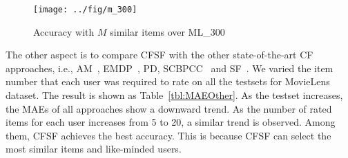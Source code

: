 \begin{figure}[htb]
  \centering
  \texttt{[image: ../fig/m\_300]}\\
  \vspace{-2ex}\caption{Accuracy with $M$ similar items over ML\_300}
  \label{fig:m}
\end{figure}

The other aspect is to compare CFSF with the other state-of-the-art CF approaches, i.e., AM~\cite{HOFMANN@TOIS2004}, EMDP~\cite{Ma2007@SIGIR}, PD\cite{Pennock:Personality@2000}, SCBPCC~\cite{Xuegr:CF@2005} and SF~\cite{wangjun:CF@2006}. We varied the item number that each user was required to rate on all the testsets for MovieLens dataset. The result is shown as Table~\ref{tbl:MAEOther}. As the testset increases, the MAEs of all approaches show a downward trend. As the number of rated items for each user increases from 5 to 20, a similar trend is observed. Among them, CFSF achieves the best accuracy. This is because CFSF can select the most similar items and like-minded users.

